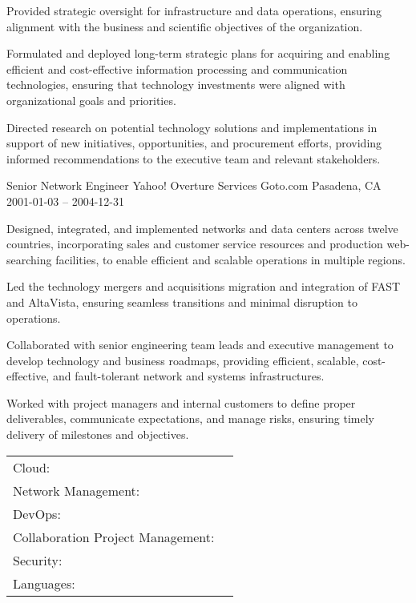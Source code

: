 \documentclass[]{awesome-cv}
\begin{document}
\begin{cventries}
	{\begin{cvitems}
		\item {Provided strategic oversight for infrastructure and data operations, ensuring alignment with the business and scientific objectives of the organization.}
		\item {Formulated and deployed long-term strategic plans for acquiring and enabling efficient and cost-effective information processing and communication technologies, ensuring that technology investments were aligned with organizational goals and priorities.}
		\item {Directed research on potential technology solutions and implementations in support of new initiatives, opportunities, and procurement efforts, providing informed recommendations to the executive team and relevant stakeholders.}
		\end{cvitems}}
	\cventry
	{Senior Network Engineer}
	{Yahoo! \textbar{} Overture Services \textbar{} Goto.com}
	{Pasadena, CA}
	{2001-01-03 – 2004-12-31}
	{\begin{cvitems}
		\item {Designed, integrated, and implemented networks and data centers across twelve countries, incorporating sales and customer service resources and production web-searching facilities, to enable efficient and scalable operations in multiple regions.}
		\item {Led the technology mergers and acquisitions migration and integration of FAST and AltaVista, ensuring seamless transitions and minimal disruption to operations.}
		\item {Collaborated with senior engineering team leads and executive management to develop technology and business roadmaps, providing efficient, scalable, cost-effective, and fault-tolerant network and systems infrastructures.}
		\item {Worked with project managers and internal customers to define proper deliverables, communicate expectations, and manage risks, ensuring timely delivery of milestones and objectives.}
		\end{cvitems}}
\end{cventries}
\begin{cventries}
	\cventry
	{}
	{\def\arraystretch{1.15}{\begin{tabular}{ l l }
		Cloud:  & {\skill{ AWS, Azure, Digital Ocean, CloudFlare}} \\
		Network Management:  & {\skill{ Solarwinds Orion, ManageEngine OpManager, Zabbix}} \\
		DevOps:  & {\skill{ Ansible \textbar{} Terraform, Github \textbar{} git, Docker \textbar{} Vagrant \textbar{} Multipass}} \\
		Collaboration \textbar{} Project Management:  & {\skill{ Asana, Notion, Trello, Smartsheet, Jira \textbar{} Confluence, Kanban \textbar{} Scrum}} \\
		Security:  & {\skill{ Fortigate, Cisco ASA, Rapid7}} \\
		Languages:  & {\skill{ Python, Javascript, PHP}} \\
		\end{tabular}}}
	{}
	{}
	{}
\end{cventries}
\end{document}
